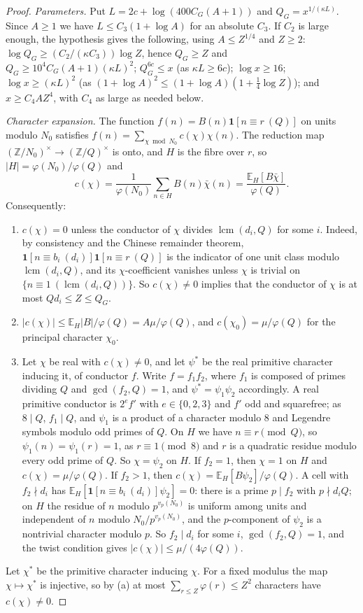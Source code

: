 \documentclass[11pt,reqno]{amsart}
\theoremstyle{definition}
\newcommand{\lcm}{\operatorname{lcm}}
\newcommand{\E}{\mathbb E}
\begin{document}
\begin{proof}
\emph{Parameters.}  Put $L=2c+\log(400C_G(A+1))$ and $Q_G=x^{1/(\kappa L)}$.  Since
$A\ge1$ we have $L\le C_3(1+\log A)$ for an absolute $C_3$.  If $C_2$ is large
enough, the hypothesis gives the following, using $A\le Z^{1/4}$ and $Z\ge2$:
$\log Q_G\ge(C_2/(\kappa C_3))\log Z$, hence $Q_G\ge Z$ and
$Q_G\ge10^4C_G(A+1)(\kappa L)^2$; $Q_G^{6c}\le x$ (as $\kappa L\ge6c$);
$\log x\ge16$; $\log x\ge(\kappa L)^2$ (as
$(1+\log A)^2\le(1+\log A)(1+\tfrac14\log Z)$); and $x\ge C_4AZ^4$, with
$C_4$ as large as needed below.

\emph{Character expansion.}  The function $f(n)=B(n)\mathbf 1[n\equiv r\ (Q)]$
on units modulo $N_0$ satisfies $f(n)=\sum_{\chi\bmod N_0}c(\chi)\chi(n)$.  The
reduction map $(\mathbb Z/N_0)^\times\to(\mathbb Z/Q)^\times$ is onto, and $H$ is the fibre
over $r$, so $|H|=\varphi(N_0)/\varphi(Q)$ and
\[
 c(\chi)=\frac1{\varphi(N_0)}\sum_{n\in H}B(n)\bar\chi(n)=\frac{\E_H[B\bar\chi]}{\varphi(Q)} .
\]
Consequently:
\begin{enumerate}
\item[(a)] $c(\chi)=0$ unless the conductor of $\chi$ divides $\lcm(d_i,Q)$ for
some $i$.  Indeed, by consistency and the Chinese remainder theorem,
$\mathbf 1[n\equiv b_i\ (d_i)]\mathbf 1[n\equiv r\ (Q)]$ is the indicator of one unit
class modulo $\lcm(d_i,Q)$, and its $\chi$-coefficient vanishes unless $\chi$ is
trivial on $\{n\equiv1\ (\lcm(d_i,Q))\}$.  So $c(\chi)\ne0$ implies that the
conductor of $\chi$ is at most $Qd_i\le Z\le Q_G$.
\item[(b)] $|c(\chi)|\le\E_H|B|/\varphi(Q)=A\mu/\varphi(Q)$, and
$c(\chi_0)=\mu/\varphi(Q)$ for the principal character $\chi_0$.
\item[(c)] Let $\chi$ be real with $c(\chi)\ne0$, and let $\psi^*$ be the real
primitive character inducing it, of conductor $f$.  Write $f=f_1f_2$, where
$f_1$ is composed of primes dividing $Q$ and $\gcd(f_2,Q)=1$, and
$\psi^*=\psi_1\psi_2$ accordingly.  A real primitive conductor is $2^ef'$
with $e\in\{0,2,3\}$ and $f'$ odd and squarefree; as $8\mid Q$, $f_1\mid Q$, and
$\psi_1$ is a product of a character modulo $8$ and Legendre symbols modulo
odd primes of $Q$.  On $H$ we have $n\equiv r\pmod Q$, so
$\psi_1(n)=\psi_1(r)=1$, as $r\equiv1\pmod8$ and $r$ is a quadratic residue
modulo every odd prime of $Q$.  So $\chi=\psi_2$ on $H$.  If $f_2=1$, then $\chi=1$
on $H$ and $c(\chi)=\mu/\varphi(Q)$.
If $f_2>1$, then $c(\chi)=\E_H[B\psi_2]/\varphi(Q)$.  A cell with $f_2\nmid d_i$
has $\E_H[\mathbf 1[n\equiv b_i\ (d_i)]\psi_2]=0$: there is a prime $p\mid f_2$ with
$p\nmid d_iQ$; on $H$ the residue of $n$ modulo $p^{v_p(N_0)}$ is uniform among
units and independent of $n$ modulo $N_0/p^{v_p(N_0)}$, and the $p$-component of
$\psi_2$ is a nontrivial character modulo $p$.  So $f_2\mid d_i$ for some $i$,
$\gcd(f_2,Q)=1$, and the twist condition gives $|c(\chi)|\le\mu/(4\varphi(Q))$.
\end{enumerate}
Let $\chi^*$ be the primitive character inducing $\chi$.  For a fixed modulus
the map $\chi\mapsto\chi^*$ is injective, so by (a) at most
$\sum_{r\le Z}\varphi(r)\le Z^2$ characters have $c(\chi)\ne0$.


\end{proof}
\end{document}
